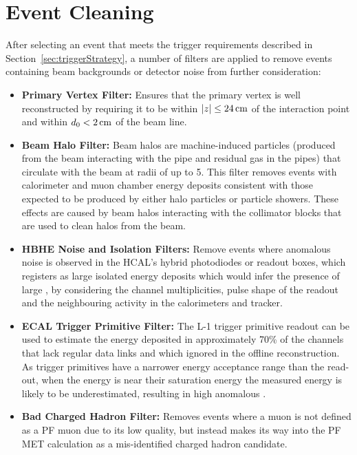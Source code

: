 \section{Event Cleaning}\label{sec:metFilters}
After selecting an event that meets the trigger requirements described in Section~\ref{sec:triggerStrategy}, a number of filters are applied to remove events containing beam backgrounds or detector noise from further consideration:

\begin{itemize}
\item \textbf{Primary Vertex Filter:} Ensures that the primary vertex is well reconstructed by requiring it to be within $|z| \leq 24\,\text{cm}$ of the interaction point and within $d_{0} < 2\,\text{cm}$ of the beam line.
\item \textbf{Beam Halo Filter:} Beam halos are machine-induced particles (\ie produced from the beam interacting with the pipe and residual gas in the pipes) that circulate with the beam at radii of up to 5\cm. This filter removes events with calorimeter and muon chamber energy deposits consistent with those expected to be produced by either halo particles or particle showers.
These effects are caused by beam halos interacting with the collimator blocks that are used to clean halos from the beam.
\item \textbf{HBHE Noise and Isolation Filters:} Remove events where anomalous noise is observed in the HCAL's hybrid photodiodes or readout boxes, which registers as large isolated energy deposits which would infer the presence of large \MET, by considering the channel multiplicities, pulse shape of the readout and the neighbouring activity in the calorimeters and tracker.
\item \textbf{ECAL Trigger Primitive Filter:} The L-1 trigger primitive readout can be used to estimate the energy deposited in approximately 70\% of the channels that lack regular data links and which ignored in the offline reconstruction. As trigger primitives have a narrower energy acceptance range than the read-out, when the energy is near their saturation energy the measured energy is likely to be underestimated, resulting in high anomalous \MET. 
\item \textbf{Bad Charged Hadron Filter:} Removes events where a muon is not defined as a PF muon due to its low quality, but instead makes its way into the PF MET calculation as a mis-identified charged hadron candidate.
\end{itemize}

